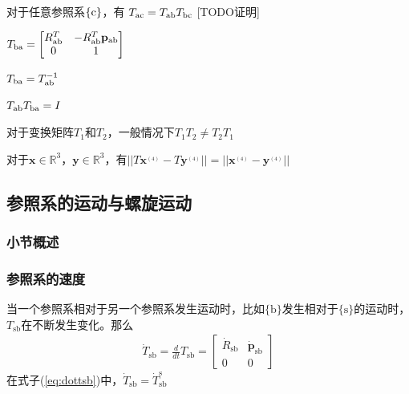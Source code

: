 \documentclass[12pt, a4paper, article, UTF8]{ctexart}
\begin{document}
\begin{mytheorem}
对于任意参照系$\{\textnormal{c}\}$，有
$T_\textnormal{ac} = T_\textnormal{ab}T_\textnormal{bc}$ [TODO证明]
\end{mytheorem}

\begin{mytheorem}
$T_\textnormal{ba} =\begin{bmatrix}
R_\textnormal{ab}^T & -R_\textnormal{ab}^T\mathbf{p}_\textnormal{ab} \\
0 & 1
\end{bmatrix}$  \label{eq:calculatetba}
\end{mytheorem}

\begin{mytheorem}
$T_\textnormal{ba} =T_\textnormal{ab}^{-1}$ 
\end{mytheorem}

\begin{mytheorem}
$T_\textnormal{ab}T_\textnormal{ba} = I$ 
\end{mytheorem}

\begin{mytheorem}
对于变换矩阵$T_1$和$T_2$，一般情况下$T_1T_2 \neq T_2T_1$
\end{mytheorem}

\begin{mytheorem}
对于$ \mathbf{x}\in\mathbb{R}^3$，$\mathbf{y}\in\mathbb{R}^3$，有$||T\mathbf{x}^{{}_{(4)}}-T\mathbf{y}^{{}_{(4)}}|| = ||\mathbf{x}^{{}_{(4)}}-\mathbf{y}^{{}_{(4)}}||$
\end{mytheorem}


\subsection{参照系的运动与螺旋运动}
\subsubsection{小节概述}
\subsubsection{参照系的速度}
当一个参照系相对于另一个参照系发生运动时，比如$\{\text{b}\}$发生相对于$\{\text{s}\}$的运动时，$T_\text{sb}$在不断发生变化。那么
\begin{align}
\dot{T}_\text{sb} = \frac{d}{dt}T_\text{sb} = \begin{bmatrix}
\dot{R}_\text{sb} & \dot{\mathbf{p}}_\text{sb}\\
0 & 0
\end{bmatrix}  \label{eq:dottsb}
\end{align}
在式子(\ref{eq:dottsb})中，$\dot{T}_\text{sb} = \dot{T}_\text{sb}^\text{s}$
\end{document}
